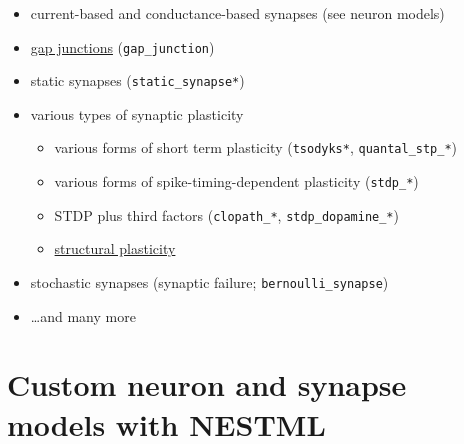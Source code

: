 \documentclass[8pt,t,usepdftitle=false]{beamer}
\begin{document}
\begin{frame}[t,plain]
  \frametitle{\ttl}
  \begin{itemize}
  \item current-based and conductance-based synapses (see neuron models)
  \item \href{https://nest-simulator.readthedocs.io/en/stable/models/gap_junction.html}{gap junctions} (\texttt{gap\_junction}) 
  \item static synapses (\texttt{static\_synapse*})
  \item various types of synaptic plasticity
    \begin{itemize}\itemsep1ex
    \item various forms of short term plasticity (\texttt{tsodyks*}, \texttt{quantal\_stp\_*})
    \item various forms of spike-timing-dependent plasticity (\texttt{stdp\_*})
    \item STDP plus third factors (\texttt{clopath\_*}, \texttt{stdp\_dopamine\_*})
    \item \href{https://nest-simulator.readthedocs.io/en/stable/auto_examples/structural_plasticity.html}{structural plasticity} {\tiny\parencite{Butz13_e1003259}}
    \end{itemize}
  \item stochastic synapses (synaptic failure; \texttt{bernoulli\_synapse})
  \item \ldots and many more
\end{itemize}
\end{frame}
\def\ttl{Custom neuron and synapse models with NESTML}\section{\ttl}
\end{document}
